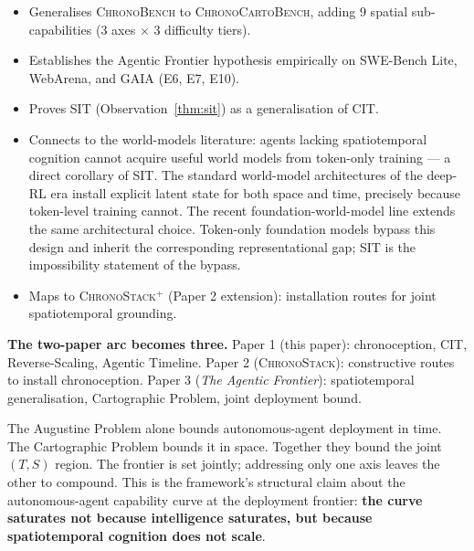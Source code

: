 \begin{itemize}[leftmargin=*]
    \item Generalises \textsc{ChronoBench} to \textsc{ChronoCartoBench}, adding 9 spatial sub-capabilities (3 axes $\times$ 3 difficulty tiers).
    \item Establishes the Agentic Frontier hypothesis empirically on SWE-Bench Lite, WebArena, and GAIA (E6, E7, E10).
    \item Proves SIT (Observation~\ref{thm:sit}) as a generalisation of CIT.
    \item Connects to the world-models literature: agents lacking spatiotemporal cognition cannot acquire useful world models from token-only training --- a direct corollary of SIT. The standard world-model architectures of the deep-RL era \citep{ha2018worldmodels,hafner2019dreamer,schrittwieser2020muzero} install explicit latent state for both space and time, precisely because token-level training cannot. The recent foundation-world-model line \citep{bruce2024genie} extends the same architectural choice. Token-only foundation models bypass this design and inherit the corresponding representational gap; SIT is the impossibility statement of the bypass.
    \item Maps to \textsc{ChronoStack}$^{+}$ (Paper 2 extension): installation routes for joint spatiotemporal grounding.
\end{itemize}

\textbf{The two-paper arc becomes three.} Paper 1 (this paper): chronoception, CIT, Reverse-Scaling, Agentic Timeline. Paper 2 (\textsc{ChronoStack}): constructive routes to install chronoception. Paper 3 (\emph{The Agentic Frontier}): spatiotemporal generalisation, Cartographic Problem, joint deployment bound.

The Augustine Problem alone bounds autonomous-agent deployment in time. The Cartographic Problem bounds it in space. Together they bound the joint $(T, S)$ region. The frontier is set jointly; addressing only one axis leaves the other to compound. This is the framework's structural claim about the autonomous-agent capability curve at the deployment frontier: \textbf{the curve saturates not because intelligence saturates, but because spatiotemporal cognition does not scale}.
